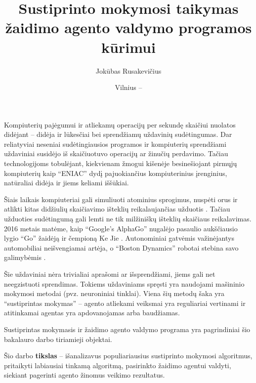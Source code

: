 \documentclass{VUMIFPSbakalaurinis}
\title{Sustiprinto mokymosi taikymas žaidimo agento valdymo programos kūrimui}
\author{Jokūbas Rusakevičius}
\date{Vilnius – \the\year}
\begin{document}
\maketitle

\setcounter{page}{2}


Kompiuterių pajėgumui ir atliekamų operacijų per sekundę skaičiui nuolatos didėjant -- didėja ir lūkesčiai bei sprendžiamų uždavinių sudėtingumas. Dar reliatyviai neseniai sudėtingiausios programos ir kompiuterių sprendžiami uždaviniai susidėjo iš skaičiuotuvo operacijų ar žinučių perdavimo. Tačiau technologijoms tobulėjant, kiekvienam žmogui kišenėje besinešiojant pirmųjų kompiuterių kaip \enquote{ENIAC} \cite{computer_history} dydį pajuokiančius kompiuterinius įrenginius, natūraliai didėja ir jiems keliami iššūkiai. \par

Šiais laikais kompiuteriai gali simuliuoti atominius sprogimus, nuspėti orus ir atlikti kitas didžiulių skaičiavimo išteklių reikalaujančias užduotis \cite{supercomputers}. Tačiau užduoties sudėtingumą gali lemti ne tik milžiniškų išteklių skaičiaus reikalavimas. 2016 metais matėme, kaip \enquote{Google’s AlphaGo} nugalėjo pasaulio aukščiausio lygio \enquote{Go} žaidėją ir čempioną Ke Jie \cite{go}. Autonominiai gatvėmis važinėjantys automobiliai neišvengiamai artėja, o \enquote{Boston Dynamics} robotai stebina savo galimybėmis \cite{bostondynamics}. \par

Šie uždaviniai nėra trivialiai aprašomi ar išsprendžiami, jiems gali net neegzistuoti sprendimas. Tokiems uždaviniams spręsti yra naudojami mašininio mokymosi metodai (pvz. neuroniniai tinklai). Viena šių metodų šaka yra \enquote{sustiprintas mokymas} -- agento atliekami veiksmai yra reguliariai vertinami ir atitinkamai agentas yra apdovanojamas arba baudžiamas. \par

Sustiprintas mokymasis ir žaidimo agento valdymo programa yra pagrindiniai šio bakalauro darbo tiriamieji objektai.



Šio darbo \textbf{tikslas} -- išanalizavus populiariausius sustiprinto mokymosi algoritmus, pritaikyti labiausiai tinkamą algoritmą, pasirinkto žaidimo agentui valdyti, siekiant pagerinti agento žinomus veikimo rezultatus.\par
\end{document}
